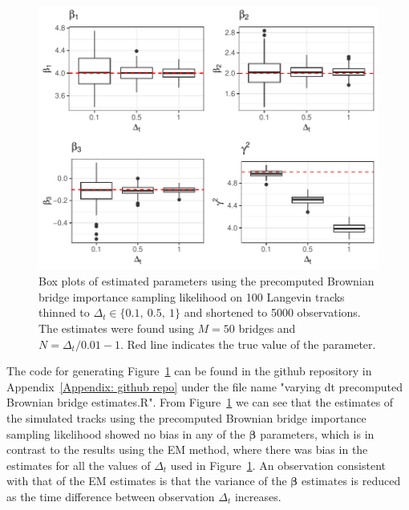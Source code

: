 \begin{figure}[H]
    \centering
    \includegraphics[width=\linewidth]{Images/Results/varying dt estimates precomputed BB.pdf}
    \caption[Box plots of Parameter Estimates using precomputed Brownian bridge importance sampling at different sampling intervals]{Box plots of estimated parameters using the precomputed Brownian bridge importance sampling likelihood on 100 Langevin tracks thinned to $\Delta_t \in \{0.1, \ 0.5, \ 1\}$ and shortened to 5000 observations. The estimates were found using $M=50$ bridges and $N = \Delta_t/0.01 -1$. Red line indicates the true value of the parameter.}
    \label{fig:varying dt boxplot precomputed BB}
\end{figure}


The code for generating Figure~\ref{fig:varying dt boxplot precomputed BB} can be found in the github repository in Appendix~\ref{Appendix: github repo} under the file name "varying dt precomputed Brownian bridge estimates.R". From Figure~\ref{fig:varying dt boxplot precomputed BB} we can see that the estimates of the simulated tracks using the precomputed Brownian bridge importance sampling likelihood showed no bias in any of the $\bm \beta$ parameters, which is in contrast to the results using the EM method, where there was bias in the estimates for all the values of $\Delta_t$ used in Figure~\ref{fig:varying dt boxplot precomputed BB}. An observation consistent with that of the EM estimates is that the variance of the $\bm \beta$ estimates is reduced as the time difference between observation $\Delta_t$ increases. 



